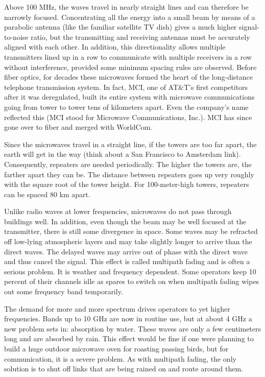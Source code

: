 \documentclass[b5paper,11pt]{memoir}
\begin{document}
Above 100 MHz, the waves travel in nearly straight lines and can
therefore be narrowly focused. Concentrating all the energy into a small
beam by means of a parabolic antenna (like the familiar satellite TV
dish) gives a much higher signal-to-noise ratio, but the transmitting
and receiving antennas must be accurately aligned with each other. In
addition, this directionality allows multiple transmitters lined up in a
row to communicate with multiple receivers in a row without
interference, provided some minimum spacing rules are observed. Before
fiber optics, for decades these microwaves formed the heart of the
long-distance telephone transmission system. In fact, MCI, one of
AT\&T's first competitors after it was deregulated, built its entire
system with microwave communications going from tower to tower tens of
kilometers apart. Even the company's name reflected this (MCI stood for
Microwave Communications, Inc.). MCI has since gone over to fiber and
merged with WorldCom.

Since the microwaves travel in a straight line, if the towers are too
far apart, the earth will get in the way (think about a San Francisco to
Amsterdam link). Consequently, repeaters are needed periodically. The
higher the towers are, the farther apart they can be. The distance
between repeaters goes up very roughly with the square root of the tower
height. For 100-meter-high towers, repeaters can be spaced 80 km apart.

Unlike radio waves at lower frequencies, microwaves do not pass through
buildings well. In addition, even though the beam may be well focused at
the transmitter, there is still some divergence in space. Some waves may
be refracted off low-lying atmospheric layers and may take slightly
longer to arrive than the direct waves. The delayed waves may arrive out
of phase with the direct wave and thus cancel the signal. This effect is
called {multipath fading} and is often a serious problem. It is weather
and frequency dependent. Some operators keep 10 percent of their
channels idle as spares to switch on when multipath fading wipes out
some frequency band temporarily.

The demand for more and more spectrum drives operators to yet higher
frequencies. Bands up to 10 GHz are now in routine use, but at about 4
GHz a new problem sets in: absorption by water. These waves are only a
few centimeters long and are absorbed by rain. This effect would be fine
if one were planning to build a huge outdoor microwave oven for roasting
passing birds, but for communication, it is a severe problem. As with
multipath fading, the only solution is to shut off links that are being
rained on and route around them.
\end{document}
